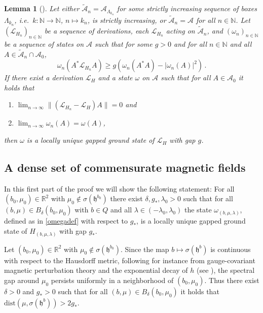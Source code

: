 \documentclass[a4paper]{article}
\newcommand{\w}{\omega}
\newcommand{\N}{\mathbb{N}}
\newcommand{\mA}{\mathcal{A}}
\newcommand{\R}{\mathbb{R}}
\newcommand{\mL}{\mathcal{L}}
\theoremstyle{plain}
\newtheorem{lemma}[theorem]{Lemma}
\theoremstyle{definition}
\theoremstyle{remark}
\renewcommand{\(}{\left(}
\renewcommand{\)}{\right)}
\begin{document}
\begin{lemma}[{\cite[Lemma~G.1]{WMMMT24}}] \label{lem:gaplimit} 
Let either $\tilde{\mA}_n=\mA_{\Lambda_{k_n}}$ for some strictly increasing sequence of boxes $\Lambda_{k_n}$, i.e.\ $k:\N\to\N$, $n\mapsto k_n$, is strictly increasing, or $\tilde{\mA}_n=\mA$ for all $n\in\N$.
Let $(\mL_{H_n})_{n\in\N}$ be a sequence of derivations, each $\mL_{H_n}$ acting on $\tilde{\mA}_n$, and $(\w_n)_{n\in\N}$ be a sequence of states on $\mA$ such that for some $g>0$ and for all $n\in\N$ and all $A\in \tilde{\mA}_n\cap\mA_0$, 
  \begin{equation}\label{eq:gap2}
  \w_n( A^* \mL_{H_n} A ) \geq g \left( \w_n(A^* A) - \left| \w_n(A) \right|^2 \right)\,.
    \end{equation}
 If  there exist a derivation $\mL_H$ and a state $\w$  on $\mA$ such that for all $A\in\mA_0$ it holds that
 \begin{enumerate}[label={(\roman*)}, ref={(\roman*)}]
 \item \label{item:convergenceLH} $\lim_{n\to \infty}\|(\mL_{H_n}-\mL_H)A\|=0$ and 
 \item \label{item:convergenceGS} $\lim_{n\to \infty}\w_n(A)= \w(A)$,
 \end{enumerate}
 then $\w$ is a locally unique gapped ground state of $\mL_H$ with gap $g$.
\end{lemma}
 


\subsection{A dense set of commensurate magnetic fields} \label{sec:commensurate}

In this first part of the proof we will show the following statement: For all $(b_0,\mu_0)\in \R^2 $ with $\mu_0\notin \sigma(\mathfrak{h}^{b_0})$ there exist $\delta,g_*,\lambda_0>0$ such that for all $(b,\mu)\in B_{\delta}(b_0,\mu_0)$ with $b\in Q$ and all $\lambda \in (-\lambda_0,\lambda_0)$ the state $\w_{(b,\mu,\lambda)}$, defined as in \eqref{omegadef} with respect to $g_*$, is a locally unique gapped ground state of $H_{(b,\mu,\lambda)}$ with gap $g_*$.

Let $(b_0,\mu_0)\in \R^2$ with $\mu_0\notin \sigma(\mathfrak{h}^{b_0})$.
Since the map  $b\mapsto\sigma(\mathfrak h^b)$ is continuous with respect to the Hausdorff metric, following for instance from gauge-covariant magnetic perturbation theory and the exponential decay of $h$ (see \cite{cornean2010lipschitz}), the spectral gap around $\mu_0$ persists uniformly in a neighborhood of $(b_0,\mu_0)$. Thus there exist $\delta>0$ and $g_*>0$ such that for all $(b,\mu)\in B_\delta(b_0,\mu_0)$ it holds that $\mathrm{dist}(\mu,\sigma(\mathfrak{h}^b))>2 g_*$. 
\end{document}
